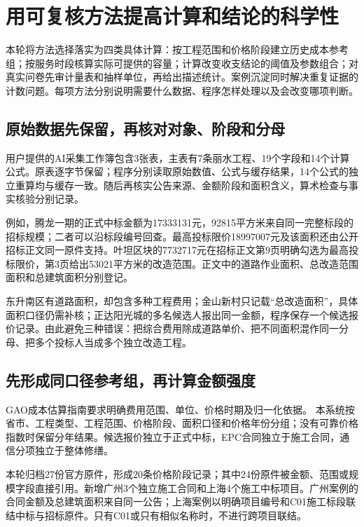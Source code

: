 
\section{用可复核方法提高计算和结论的科学性}

本轮将方法选择落实为四类具体计算：按工程范围和价格阶段建立历史成本参考组；按服务时段核算实际可提供的容量；计算改变收支结论的阈值及参数组合；对真实问卷先审计量表和抽样单位，再给出描述统计。案例沉淀同时解决重复证据的计数问题。每项方法分别说明需要什么数据、程序怎样处理以及会改变哪项判断。

\subsection{原始数据先保留，再核对对象、阶段和分母}

用户提供的AI采集工作簿包含3张表，主表有7条丽水工程、19个字段和14个计算公式。原表逐字节保留；程序分别读取原始数值、公式与缓存结果，14个公式的独立重算均与缓存一致。随后再核实公告来源、金额阶段和面积含义，算术检查与事实核验分别记录。

例如，腾龙一期的正式中标金额为17333131元，92815平方米来自同一完整标段的招标规模；二者可以沿标段编号回查。最高投标限价18997007元及该面积还由公开招标正文同一原件支持。叶坦区块的7732717元在招标正文第9页明确勾选为最高投标限价，第3页给出53021平方米的改造范围。正文中的道路作业面积、总改造范围面积和总建筑面积分别登记。

东升南区有道路面积，却包含多种工程费用；金山新村只记载“总改造面积”，具体面积口径仍需补核；正达阳光城的多名候选人报出同一金额，程序保存一个候选报价记录。由此避免三种错误：把综合费用除成道路单价、把不同面积混作同一分母、把多个投标人当成多个独立改造工程。

\subsection{先形成同口径参考组，再计算金额强度}

GAO成本估算指南要求明确费用范围、单位、价格时期及归一化依据。\cite{gao2020} 本系统按省市、工程类型、工程范围、价格阶段、面积口径和价格年份分组；没有可靠价格指数时保留分年结果。候选报价独立于正式中标，EPC合同独立于施工合同，通信分项独立于整体修缮。

本轮归档27份官方原件，形成20条价格阶段记录；其中24份原件被金额、范围或规模字段直接引用。新增广州3个独立施工合同和上海4个施工中标项目。广州案例的合同金额及总建筑面积来自同一公告；上海案例以明确项目编号和C01施工标段联结中标与招标原件。只有C01或只有相似名称时，不进行跨项目联结。

